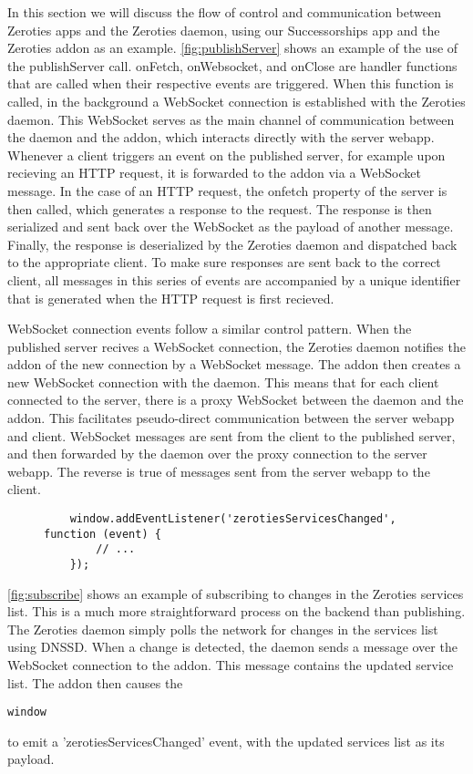 In this section we will discuss the flow of control and communication between Zeroties apps and the Zeroties daemon, using our Successorships app and the Zeroties addon as an example.
\autoref{fig:publishServer} shows an example of the use of the publishServer call.
onFetch, onWebsocket, and onClose are handler functions that are called when their respective events are triggered.
When this function is called, in the background a WebSocket connection is established with the Zeroties daemon. 
This WebSocket serves as the main channel of communication between the daemon and the addon, which interacts directly with the server webapp.
Whenever a client triggers an event on the published server, for example upon recieving an HTTP request, it is forwarded to the addon via a WebSocket message.
In the case of an HTTP request, the onfetch property of the server is then called, which generates a response to the request.
The response is then serialized and sent back over the WebSocket as the payload of another message.
Finally, the response is deserialized by the Zeroties daemon and dispatched back to the appropriate client.
To make sure responses are sent back to the correct client, all messages in this series of events are accompanied by a unique identifier that is generated when the HTTP request is first recieved.

WebSocket connection events follow a similar control pattern.
When the published server recives a WebSocket connection, the Zeroties daemon notifies the addon of the new connection by a WebSocket message.
The addon then creates a new WebSocket connection with the daemon. This means that for each client connected to the server, there is a proxy WebSocket between the daemon and the addon.
This facilitates pseudo-direct communication between the server webapp and client.
WebSocket messages are sent from the client to the published server, and then forwarded by the daemon over the proxy connection to the server webapp.
The reverse is true of messages sent from the server webapp to the client.

\begin{figure}[h]
    \centering
\begin{lstlisting}
	window.addEventListener('zerotiesServicesChanged', function (event) {
        // ...
    });
\end{lstlisting}
    \caption{}
    \label{fig:subscribe}
\end{figure}

\autoref{fig:subscribe} shows an example of subscribing to changes in the Zeroties services list.
This is a much more straightforward process on the backend than publishing. The Zeroties daemon simply polls
the network for changes in the services list using DNSSD. When a change is detected, the daemon sends a message over the WebSocket connection to the addon.
This message contains the updated service list. The addon then causes the \begin{verbatim}window\end{verbatim} to emit a 'zerotiesServicesChanged' event, with the updated services list as its payload. 
